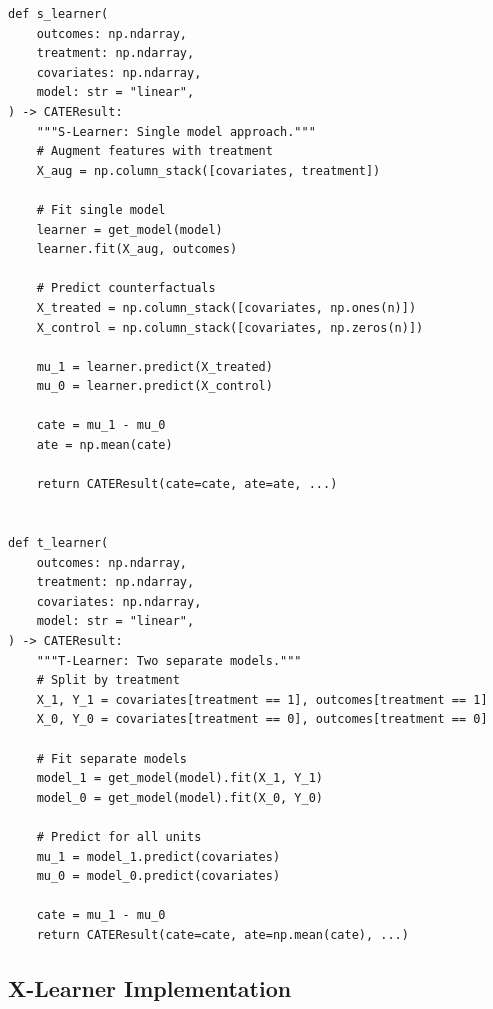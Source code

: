 \begin{verbatim}
def s_learner(
    outcomes: np.ndarray,
    treatment: np.ndarray,
    covariates: np.ndarray,
    model: str = "linear",
) -> CATEResult:
    """S-Learner: Single model approach."""
    # Augment features with treatment
    X_aug = np.column_stack([covariates, treatment])

    # Fit single model
    learner = get_model(model)
    learner.fit(X_aug, outcomes)

    # Predict counterfactuals
    X_treated = np.column_stack([covariates, np.ones(n)])
    X_control = np.column_stack([covariates, np.zeros(n)])

    mu_1 = learner.predict(X_treated)
    mu_0 = learner.predict(X_control)

    cate = mu_1 - mu_0
    ate = np.mean(cate)

    return CATEResult(cate=cate, ate=ate, ...)


def t_learner(
    outcomes: np.ndarray,
    treatment: np.ndarray,
    covariates: np.ndarray,
    model: str = "linear",
) -> CATEResult:
    """T-Learner: Two separate models."""
    # Split by treatment
    X_1, Y_1 = covariates[treatment == 1], outcomes[treatment == 1]
    X_0, Y_0 = covariates[treatment == 0], outcomes[treatment == 0]

    # Fit separate models
    model_1 = get_model(model).fit(X_1, Y_1)
    model_0 = get_model(model).fit(X_0, Y_0)

    # Predict for all units
    mu_1 = model_1.predict(covariates)
    mu_0 = model_0.predict(covariates)

    cate = mu_1 - mu_0
    return CATEResult(cate=cate, ate=np.mean(cate), ...)
\end{verbatim}

\subsection{X-Learner Implementation}

